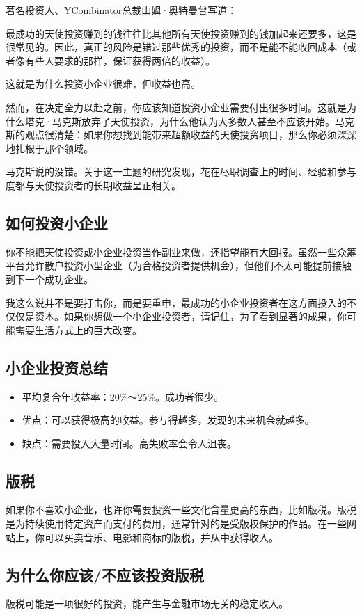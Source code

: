 著名投资人、YCombinator总裁山姆·奥特曼曾写道：

最成功的天使投资赚到的钱往往比其他所有天使投资赚到的钱加起来还要多，这是很常见的。因此，真正的风险是错过那些优秀的投资，而不是能不能收回成本（或者像有些人要求的那样，保证获得两倍的收益）。

这就是为什么投资小企业很难，但收益也高。

然而，在决定全力以赴之前，你应该知道投资小企业需要付出很多时间。这就是为什么塔克·马克斯放弃了天使投资，为什么他认为大多数人甚至不应该开始。马克斯的观点很清楚：如果你想找到能带来超额收益的天使投资项目，那么你必须深深地扎根于那个领域。

马克斯说的没错。关于这一主题的研究发现，花在尽职调查上的时间、经验和参与度都与天使投资者的长期收益呈正相关。

\subsection{如何投资小企业}
你不能把天使投资或小企业投资当作副业来做，还指望能有大回报。虽然一些众筹平台允许散户投资小型企业（为合格投资者提供机会），但他们不太可能提前接触到下一个成功企业。

我这么说并不是要打击你，而是要重申，最成功的小企业投资者在这方面投入的不仅仅是资本。如果你想做一个小企业投资者，请记住，为了看到显著的成果，你可能需要生活方式上的巨大改变。

\subsection{小企业投资总结}
\begin{itemize}
\item 平均复合年收益率：20\%～25\%。成功者很少。
\item 优点：可以获得极高的收益。参与得越多，发现的未来机会就越多。
\item 缺点：需要投入大量时间。高失败率会令人沮丧。
\end{itemize}
\subsection{版税}
如果你不喜欢小企业，也许你需要投资一些文化含量更高的东西，比如版税。版税是为持续使用特定资产而支付的费用，通常针对的是受版权保护的作品。在一些网站上，你可以买卖音乐、电影和商标的版税，并从中获得收入。

\subsection{为什么你应该/不应该投资版税}
版税可能是一项很好的投资，能产生与金融市场无关的稳定收入。

